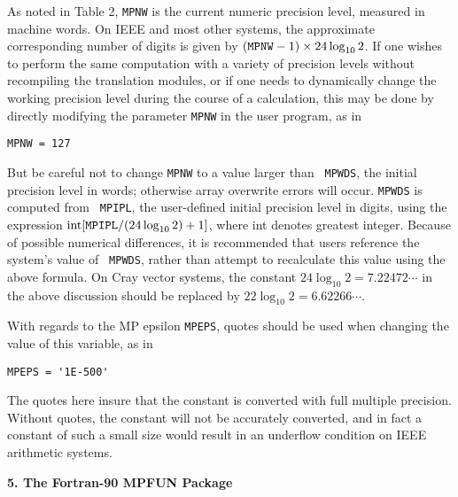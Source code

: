 As noted in Table 2, {\tt MPNW} is the current numeric precision
level, measured in machine words.  On IEEE and most other systems, the
approximate corresponding number of digits is given by $({\tt MPNW} -
1) \times 24 \log_{10} 2$.  If one wishes to perform the same
computation with a variety of precision levels without recompiling the
translation modules, or if one needs to dynamically change the working
precision level during the course of a calculation, this may be done
by directly modifying the parameter {\tt MPNW} in the user program, as
in

\begin{tt} \begin{small} \begin{verbatim}
MPNW = 127
\end{verbatim} \end{small} \end{tt}

\noindent
But be careful not to change {\tt MPNW} to a value larger than {\tt
MPWDS}, the initial precision level in words; otherwise array
overwrite errors will occur.  {\tt MPWDS} is computed from {\tt
MPIPL}, the user-defined initial precision level in digits, using the
expression ${\rm int} [{\tt MPIPL} / (24 \log_{10} 2) + 1]$, where int
denotes greatest integer.  Because of possible numerical differences,
it is recommended that users reference the system's value of {\tt
MPWDS}, rather than attempt to recalculate this value using the above
formula.  On Cray vector systems, the constant $24 \log_{10} 2 =
7.22472 \cdots$ in the above discussion should be replaced by $22
\log_{10} 2 = 6.62266 \cdots$.

With regards to the MP epsilon {\tt MPEPS}, quotes should be used when
changing the value of this variable, as in

\begin{tt} \begin{small} \begin{verbatim}
MPEPS = '1E-500'
\end{verbatim} \end{small} \end{tt}

\noindent
The quotes here insure that the constant is converted with full
multiple precision.  Without quotes, the constant will not be
accurately converted, and in fact a constant of such a small size
would result in an underflow condition on IEEE arithmetic systems.

\vspace{2ex} \noindent
{\bf 5. The Fortran-90 MPFUN Package}


